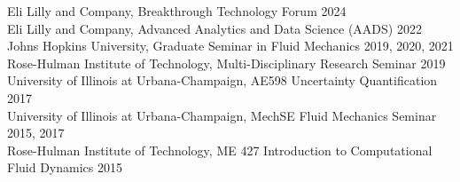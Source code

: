 Eli Lilly and Company, Breakthrough Technology Forum \hfill 2024\vspace{1pt}\\
Eli Lilly and Company, Advanced Analytics and Data Science (AADS) \hfill 2022\vspace{1pt}\\
Johns Hopkins University, Graduate Seminar in Fluid Mechanics \hfill 2019, 2020, 2021\vspace{1pt}\\
Rose-Hulman Institute of Technology, Multi-Disciplinary Research Seminar \hfill 2019\vspace{1pt}\\
University of Illinois at Urbana-Champaign, AE598 Uncertainty Quantification \hfill 2017\vspace{1pt}\\
University of Illinois at Urbana-Champaign, MechSE Fluid Mechanics Seminar \hfill 2015, 2017\vspace{1pt}\\
Rose-Hulman Institute of Technology, ME 427 Introduction to Computational Fluid Dynamics \hfill 2015

